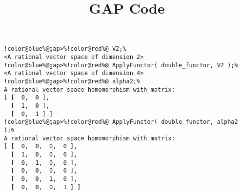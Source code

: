 \documentclass[12pt]{amsart}
\title{GAP Code}
\author{}
\begin{document}
\maketitle

\begin{Verbatim}[commandchars=!@\%,frame=single]
!color@blue%@gap>%!color@red%@ V2;%
<A rational vector space of dimension 2>
!color@blue%@gap>%!color@red%@ ApplyFunctor( double_functor, V2 );%
<A rational vector space of dimension 4>
!color@blue%@gap>%!color@red%@ alpha2;%
A rational vector space homomorphism with matrix:
[ [  0,  0 ],
  [  1,  0 ],
  [  0,  1 ] ]
!color@blue%@gap>%!color@red%@ ApplyFunctor( double_functor, alpha2 );%
A rational vector space homomorphism with matrix:
[ [  0,  0,  0,  0 ],
  [  1,  0,  0,  0 ],
  [  0,  1,  0,  0 ],
  [  0,  0,  0,  0 ],
  [  0,  0,  1,  0 ],
  [  0,  0,  0,  1 ] ]
\end{Verbatim}
\end{document}
